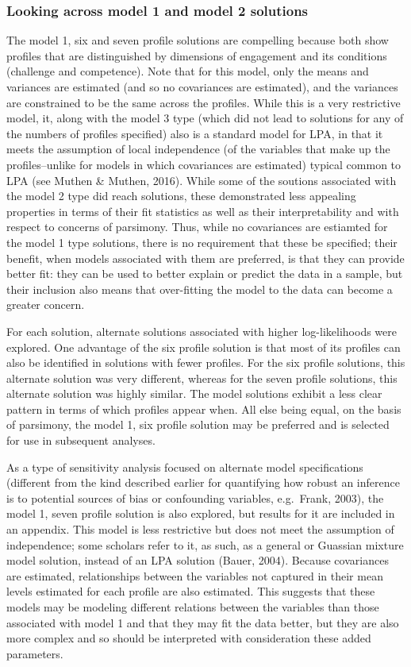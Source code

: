 \documentclass[]{book}
\theoremstyle{definition}
\theoremstyle{definition}
\theoremstyle{definition}
\theoremstyle{remark}
\begin{document}
\subsubsection{Looking across model 1 and model 2
solutions}\label{looking-across-model-1-and-model-2-solutions}

The model 1, six and seven profile solutions are compelling because both
show profiles that are distinguished by dimensions of engagement and its
conditions (challenge and competence). Note that for this model, only
the means and variances are estimated (and so no covariances are
estimated), and the variances are constrained to be the same across the
profiles. While this is a very restrictive model, it, along with the
model 3 type (which did not lead to solutions for any of the numbers of
profiles specified) also is a standard model for LPA, in that it meets
the assumption of local independence (of the variables that make up the
profiles--unlike for models in which covariances are estimated) typical
common to LPA (see Muthen \& Muthen, 2016). While some of the soutions
associated with the model 2 type did reach solutions, these demonstrated
less appealing properties in terms of their fit statistics as well as
their interpretability and with respect to concerns of parsimony. Thus,
while no covariances are estiamted for the model 1 type solutions, there
is no requirement that these be specified; their benefit, when models
associated with them are preferred, is that they can provide better fit:
they can be used to better explain or predict the data in a sample, but
their inclusion also means that over-fitting the model to the data can
become a greater concern.

For each solution, alternate solutions associated with higher
log-likelihoods were explored. One advantage of the six profile solution
is that most of its profiles can also be identified in solutions with
fewer profiles. For the six profile solutions, this alternate solution
was very different, whereas for the seven profile solutions, this
alternate solution was highly similar. The model solutions exhibit a
less clear pattern in terms of which profiles appear when. All else
being equal, on the basis of parsimony, the model 1, six profile
solution may be preferred and is selected for use in subsequent
analyses.

As a type of sensitivity analysis focused on alternate model
specifications (different from the kind described earlier for
quantifying how robust an inference is to potential sources of bias or
confounding variables, e.g.~Frank, 2003), the model 1, seven profile
solution is also explored, but results for it are included in an
appendix. This model is less restrictive but does not meet the
assumption of independence; some scholars refer to it, as such, as a
general or Guassian mixture model solution, instead of an LPA solution
(Bauer, 2004). Because covariances are estimated, relationships between
the variables not captured in their mean levels estimated for each
profile are also estimated. This suggests that these models may be
modeling different relations between the variables than those associated
with model 1 and that they may fit the data better, but they are also
more complex and so should be interpreted with consideration these added
parameters.
\end{document}

